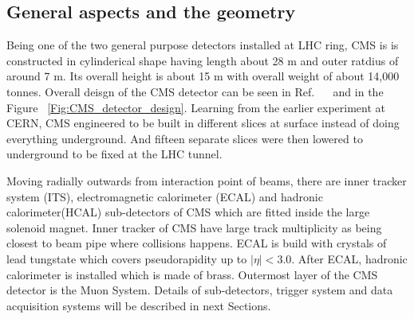 \subsection{General aspects and the geometry}
Being one of the two general purpose detectors installed at LHC ring, CMS is is constructed in cylinderical shape having length about 28 m and outer ratdius of around 7 m. Its overall height is about 15 m with overall weight of about 14,000 tonnes. Overall deisgn of the CMS detector can be seen in Ref. ~\cite{Sakuma:2665537}~ and in the Figure ~\ref{Fig:CMS_detector_design}. 
Learning from the earlier experiment at CERN, CMS engineered to be built in different slices at surface instead of doing everything underground.  And fifteen separate slices were then lowered to underground to be fixed at the LHC tunnel.\par
Moving radially outwards from interaction point of beams, there are inner tracker system (ITS), electromagnetic calorimeter (ECAL) and hadronic calorimeter(HCAL) sub-detectors of CMS which are fitted inside the large solenoid magnet. Inner tracker of CMS have large track multiplicity as being closest to beam pipe where collisions happens.
ECAL is build with crystals of lead tungstate which covers pseudorapidity up to $|\eta| < 3.0$. After ECAL, hadronic calorimeter is installed which is made of brass. Outermost layer of the CMS detector is the Muon System. Details of sub-detectors, trigger system and data acquisition systems will be described in next Sections.
